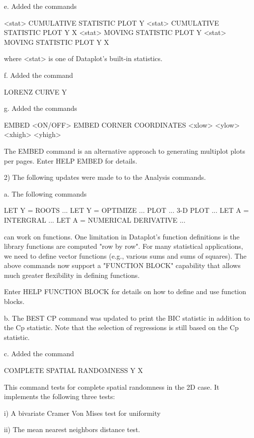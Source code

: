     e. Added the commands

         <stat> CUMULATIVE STATISTIC PLOT Y
         <stat> CUMULATIVE STATISTIC PLOT Y X
         <stat> MOVING STATISTIC PLOT Y
         <stat> MOVING STATISTIC PLOT Y X

       where <stat> is one of Dataplot's built-in statistics.

    f. Added the command

         LORENZ CURVE Y

    g. Added the commands

         EMBED <ON/OFF>
         EMBED CORNER COORDINATES <xlow> <ylow> <xhigh> <yhigh>

       The EMBED command is an alternative approach to generating
       multiplot plots per pages.  Enter HELP EMBED for details.

 2) The following updates were made to to the Analysis commands.

    a. The following commands

           LET Y = ROOTS ...
           LET Y = OPTIMIZE ...
           PLOT ...
           3-D PLOT ...
           LET A = INTERGRAL ...
           LET A = NUMERICAL DERIVATIVE ...

       can work on functions.  One limitation in Dataplot's function
       definitions is the library functions are computed "row by row".
       For many statistical applications, we need to define vector
       functions (e.g., various sums and sums of squares).  The above
       commands now support a "FUNCTION BLOCK" capability that allows
       much greater flexibility in defining functions.

       Enter HELP FUNCTION BLOCK for details on how to define and use
       function blocks.

    b. The BEST CP command was updated to print the BIC statistic
       in addition to the Cp statistic.  Note that the selection
       of regressions is still based on the Cp statistic.

    c. Added the command

         COMPLETE SPATIAL RANDOMNESS Y X

       This command tests for complete spatial randomness in the 2D case.
       It implements the following three tests:

          i) A bivariate Cramer Von Mises test for uniformity

         ii) The mean nearest neighbors distance test.


